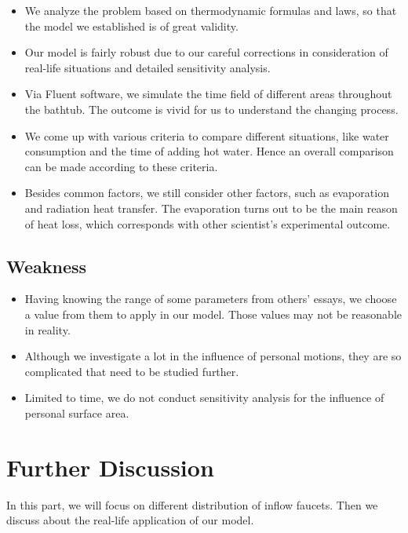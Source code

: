 \documentclass{mcmthesis}
\begin{document}
\begin{itemize}
\item We analyze the problem based on thermodynamic formulas and laws, so that the model we established is of great validity.

\item Our model is fairly robust due to our careful corrections in consideration of real-life situations and detailed sensitivity analysis.

\item Via Fluent software, we simulate the time field of different areas throughout the bathtub. The outcome is vivid for us to understand the changing process.

\item We come up with various criteria to compare different situations, like water consumption and the time of adding hot water. Hence an overall comparison can be made according to these criteria.

\item Besides common factors, we still consider other factors, such as evaporation and radiation heat transfer. The evaporation turns out to be the main reason of heat loss, which corresponds with other scientist’s experimental outcome.
\end{itemize}

\subsection{Weakness}

\begin{itemize}
\item Having knowing the range of some parameters from others’ essays, we choose a value from them to apply in our model. Those values may not be reasonable in reality.

\item Although we investigate a lot in the influence of personal motions, they are so complicated that need to be studied further.

\item Limited to time, we do not conduct sensitivity analysis for the influence of personal surface area.
\end{itemize}

\section{Further Discussion}

In this part, we will focus on different distribution of inflow faucets. Then we discuss about the real-life application of our model.
\end{document}
